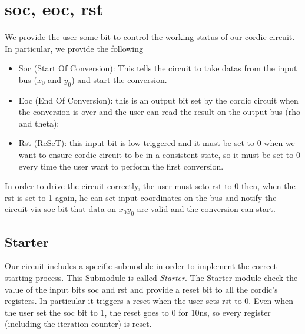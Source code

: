 \documentclass[12pt,a4paper]{report}
\begin{document}
\section{soc, eoc, rst}
We provide the user some bit to control the working status of our cordic circuit. In particular, we provide the following
\begin{itemize}
	\item Soc (Start Of Conversion): This tells the circuit to take datas from the input bus ($x_{0}$ and $y_0$) and start the conversion.
	\item Eoc (End Of Conversion): this is an output bit set by the cordic circuit when the conversion is over and the user can read the result on the output bus (rho and theta);
	\item Rst (ReSeT): this input bit is low triggered and it must be set to 0 when we want to ensure cordic circuit to be in a consistent state, so it must be set to 0 every time the user want to perform the first conversion.
\end{itemize}

In order to drive the circuit correctly, the user must seto rst to 0 then, when the rst is set to 1 again, he can set input coordinates on the bus and notify the circuit via soc bit that data on $x_0 y_0$ are valid and the conversion can start.

\subsection{Starter}
Our circuit includes a specific submodule in order to implement the correct starting process. This Submodule is called \emph{Starter}. The Starter module check the value of the input bits soc and rst and provide a reset bit to all the cordic's registers. In particular it triggers a reset when the user sets rst to 0. Even when the user set the soc bit to 1, the reset goes to 0 for 10ns, so every register (including the iteration counter) is reset.
\end{document}

